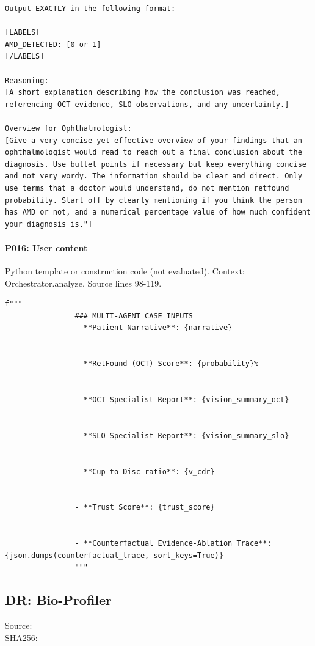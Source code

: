 \documentclass[10pt]{article}
\begin{document}
\begin{Verbatim}
Output EXACTLY in the following format:

[LABELS]
AMD_DETECTED: [0 or 1]
[/LABELS]

Reasoning:
[A short explanation describing how the conclusion was reached, referencing OCT evidence, SLO observations, and any uncertainty.]

Overview for Ophthalmologist:
[Give a very concise yet effective overview of your findings that an ophthalmologist would read to reach out a final conclusion about the diagnosis. Use bullet points if necessary but keep everything concise and not very wordy. The information should be clear and direct. Only use terms that a doctor would understand, do not mention retfound probability. Start off by clearly mentioning if you think the person has AMD or not, and a numerical percentage value of how much confident your diagnosis is."]
\end{Verbatim}
\paragraph{P016: User content}
Python template or construction code (not evaluated). Context: Orchestrator.analyze. Source lines 98-119.
\begin{Verbatim}
f"""
                ### MULTI-AGENT CASE INPUTS
                - **Patient Narrative**: {narrative}
                
                
                - **RetFound (OCT) Score**: {probability}%
                
                
                - **OCT Specialist Report**: {vision_summary_oct}
                
                
                - **SLO Specialist Report**: {vision_summary_slo}
                
                
                - **Cup to Disc ratio**: {v_cdr}
                
                
                - **Trust Score**: {trust_score}


                - **Counterfactual Evidence-Ablation Trace**: {json.dumps(counterfactual_trace, sort_keys=True)}
                """
\end{Verbatim}
\subsection{DR: Bio-Profiler}
Source: \\
SHA256: {\scriptsize{}}
\end{document}
